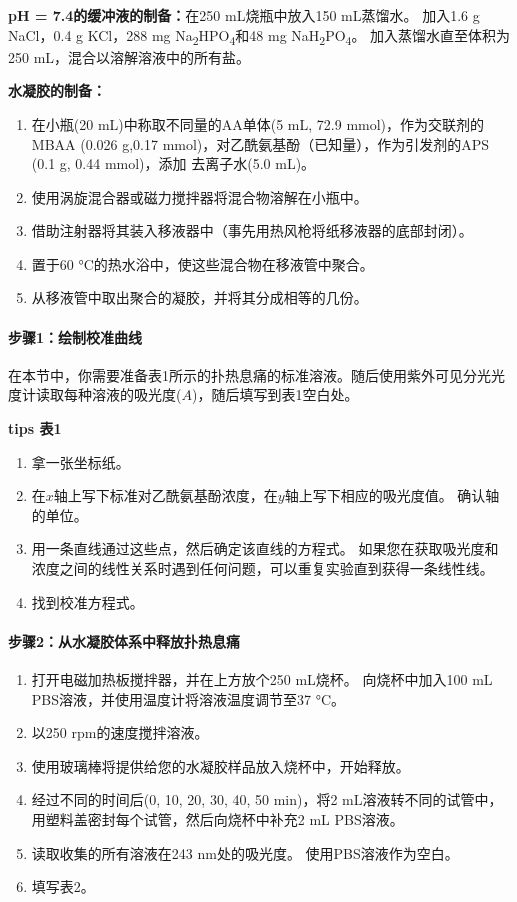 \textbf{pH = 7.4的缓冲液的制备：}在250 mL烧瓶中放入150 mL蒸馏水。
加入1.6 g NaCl，0.4 g KCl，288 mg
Na\textsubscript{2}HPO\textsubscript{4}和48 mg
NaH\textsubscript{2}PO\textsubscript{4}。 加入蒸馏水直至体积为250
mL，混合以溶解溶液中的所有盐。

\textbf{水凝胶的制备：}

\begin{enumerate}
\tightlist
\item 在小瓶(20 mL)中称取不同量的AA单体(5 mL, 72.9 mmol)，作为交联剂的MBAA
  (0.026 g,0.17 mmol)，对乙酰氨基酚（已知量），作为引发剂的APS (0.1 g,
  0.44 mmol)，添加 去离子水(5.0 mL)。
\item 使用涡旋混合器或磁力搅拌器将混合物溶解在小瓶中。
\item 借助注射器将其装入移液器中（事先用热风枪将纸移液器的底部封闭）。
\item 置于60 °C的热水浴中，使这些混合物在移液管中聚合。
\item 从移液管中取出聚合的凝胶，并将其分成相等的几份。
\end{enumerate}

\paragraph{步骤1：绘制校准曲线}

在本节中，你需要准备表1所示的扑热息痛的标准溶液。随后使用紫外可见分光光度计读取每种溶液的吸光度(\(A\))，随后填写到表1空白处。

\textbf{tips 表1}

\begin{enumerate}
\tightlist
\item
  拿一张坐标纸。
\item
  在\(x\)轴上写下标准对乙酰氨基酚浓度，在\(y\)轴上写下相应的吸光度值。
  确认轴的单位。
\item
  用一条直线通过这些点，然后确定该直线的方程式。
  如果您在获取吸光度和浓度之间的线性关系时遇到任何问题，可以重复实验直到获得一条线性线。
\item
  找到校准方程式。
\end{enumerate}

\paragraph{步骤2：从水凝胶体系中释放扑热息痛}

\begin{enumerate}
\tightlist
\item
  打开电磁加热板搅拌器，并在上方放个250 mL烧杯。 向烧杯中加入100 mL
  PBS溶液，并使用温度计将溶液温度调节至37 °C。
\item
  以250 rpm的速度搅拌溶液。
\item
  使用玻璃棒将提供给您的水凝胶样品放入烧杯中，开始释放。
\item
  经过不同的时间后(0, 10, 20, 30, 40, 50 min)，将2
  mL溶液转不同的试管中，用塑料盖密封每个试管，然后向烧杯中补充2 mL
  PBS溶液。
\item
  读取收集的所有溶液在243 nm处的吸光度。 使用PBS溶液作为空白。
\item
  填写表2。
\end{enumerate}

